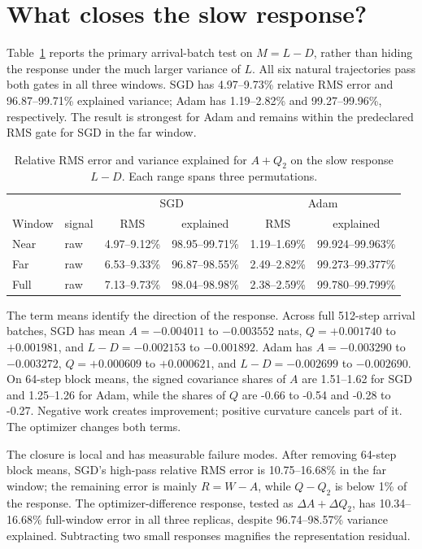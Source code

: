 \section{What closes the slow response?}

Table~\ref{tab:arrival} reports the primary arrival-batch test on \(M=L-D\), rather than hiding the response under the much larger variance of \(L\).  All six natural trajectories pass both gates in all three windows.  SGD has 4.97--9.73\% relative RMS error and 96.87--99.71\% explained variance; Adam has 1.19--2.82\% and 99.27--99.96\%, respectively.  The result is strongest for Adam and remains within the predeclared RMS gate for SGD in the far window.

\begin{table}[t]
\centering
\caption{Relative RMS error and variance explained for \(A+Q_2\) on the slow response \(L-D\).  Each range spans three permutations.}
\label{tab:arrival}
\small
\begin{tabular}{llcc|cc}
\toprule
 & & \multicolumn{2}{c|}{SGD} & \multicolumn{2}{c}{Adam}\\
Window & signal & RMS & explained & RMS & explained\\
\midrule
Near & raw & 4.97--9.12\% & 98.95--99.71\% & 1.19--1.69\% & 99.924--99.963\%\\
Far & raw & 6.53--9.33\% & 96.87--98.55\% & 2.49--2.82\% & 99.273--99.377\%\\
Full & raw & 7.13--9.73\% & 98.04--98.98\% & 2.38--2.59\% & 99.780--99.799\%\\
\bottomrule
\end{tabular}
\end{table}

The term means identify the direction of the response.  Across full 512-step arrival batches, SGD has mean \(A=-0.004011\) to \(-0.003552\) nats, \(Q=+0.001740\) to \(+0.001981\), and \(L-D=-0.002153\) to \(-0.001892\).  Adam has \(A=-0.003290\) to \(-0.003272\), \(Q=+0.000609\) to \(+0.000621\), and \(L-D=-0.002699\) to \(-0.002690\).  On 64-step block means, the signed covariance shares of \(A\) are 1.51--1.62 for SGD and 1.25--1.26 for Adam, while the shares of \(Q\) are -0.66 to -0.54 and -0.28 to -0.27.  Negative work creates improvement; positive curvature cancels part of it.  The optimizer changes both terms.

The closure is local and has measurable failure modes.  After removing 64-step block means, SGD's high-pass relative RMS error is 10.75--16.68\% in the far window; the remaining error is mainly \(R=W-A\), while \(Q-Q_2\) is below 1\% of the response.  The optimizer-difference response, tested as \(\Delta A+\Delta Q_2\), has 10.34--16.68\% full-window error in all three replicas, despite 96.74--98.57\% variance explained.  Subtracting two small responses magnifies the representation residual.

